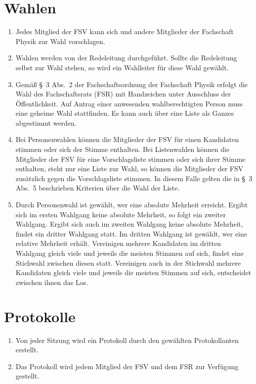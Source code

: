 \documentclass[
	a4paper,
	12pt,
	oneside,
	parskip=half-,
	pagesize,
	headsepline,
	german,
	ngerman
]{scrartcl}
\begin{document}
\section{Wahlen}
\begin{enumerate}
	\item Jedes Mitglied der FSV kann sich und andere Mitglieder der Fachschaft Physik zur Wahl vorschlagen.
	\item Wahlen werden von der Redeleitung durchgeführt. Sollte die Redeleitung selbst zur Wahl stehen, so wird ein Wahlleiter für diese Wahl gewählt.
	\item Gemäß §~3 Abs.~2 der Fachschaftsordnung der Fachschaft Physik erfolgt die Wahl des Fachschaftsrats (FSR) mit Handzeichen unter Ausschluss der Öffentlichkeit. Auf Antrag einer anwesenden wahlberechtigten Person muss eine geheime Wahl stattfinden. Es kann auch über eine Liste als Ganzes abgestimmt werden. 
	\item Bei Personenwahlen können die Mitglieder der FSV für einen Kandidaten stimmen oder sich der Stimme enthalten. Bei Listenwahlen können die Mitglieder der FSV für eine Vorschlagsliste stimmen oder sich ihrer Stimme enthalten, steht nur eine Liste zur Wahl, so können die Mitglieder der FSV zusätzlich gegen die Vorschlagsliste stimmen. In diesem Falle gelten die in §~3 Abs.~5 beschrieben Kriterien über die Wahl der Liste. 
	\item Durch Personenwahl ist gewählt, wer eine absolute Mehrheit erreicht. Ergibt sich im ersten Wahlgang keine absolute Mehrheit, so folgt ein zweiter Wahlgang. Ergibt sich auch im zweiten Wahlgang keine absolute Mehrheit, findet ein dritter Wahlgang statt. Im dritten Wahlgang ist gewählt, wer eine relative Mehrheit erhält. Vereinigen mehrere Kandidaten im dritten Wahlgang gleich viele und jeweils die meisten Stimmen auf sich, findet eine Stichwahl zwischen diesen statt. Vereinigen auch in der Stichwahl mehrere Kandidaten gleich viele und jeweils die meisten Stimmen auf sich, entscheidet zwischen ihnen das Los. 
\end{enumerate}

\section{Protokolle}
\begin{enumerate}
	\item Von jeder Sitzung wird ein Protokoll durch den gewählten Protokollanten erstellt.
	\item Das Protokoll wird jedem Mitglied der FSV und dem FSR zur Verfügung gestellt. 
\end{enumerate}
\end{document}
